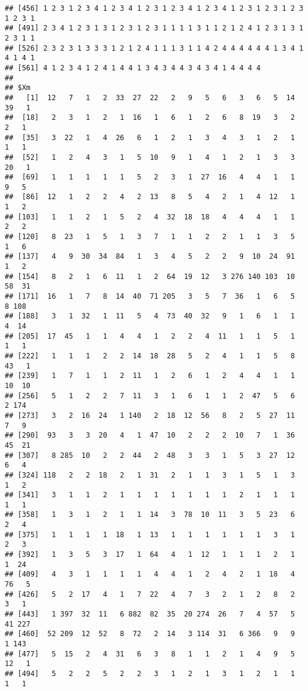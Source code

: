 \documentclass[]{article}
\begin{document}
\begin{verbatim}
## [456] 1 2 3 1 2 3 4 1 2 3 4 1 2 3 1 2 3 4 1 2 3 4 1 2 3 1 2 3 1 2 3 1 2 3 1
## [491] 2 3 4 1 2 3 1 3 1 2 3 1 2 3 1 1 1 1 3 1 1 2 1 2 4 1 2 3 1 3 1 2 3 1 1
## [526] 2 3 2 3 1 3 3 3 1 2 1 2 4 1 1 1 3 1 1 4 2 4 4 4 4 4 4 1 3 4 1 4 1 4 1
## [561] 4 1 2 3 4 1 2 4 1 4 4 1 3 4 3 4 4 3 4 3 4 1 4 4 4 4
## 
## $Xm
##   [1]  12   7   1   2  33  27  22   2   9   5   6   3   6   5  14  39   1
##  [18]   2   3   1   2   1  16   1   6   1   2   6   8  19   3   2   2   1
##  [35]   3  22   1   4  26   6   1   2   1   3   4   3   1   2   1   1   1
##  [52]   1   2   4   3   1   5  10   9   1   4   1   2   1   3   3  20   1
##  [69]   1   1   1   1   1   5   2   3   1  27  16   4   4   1   1   9   5
##  [86]  12   1   2   2   4   2  13   8   5   4   2   1   4  12   1   1   2
## [103]   1   1   2   1   5   2   4  32  18  18   4   4   4   1   1   2   2
## [120]   8  23   1   5   1   3   7   1   1   2   2   1   1   3   5   1   6
## [137]   4   9  30  34  84   1   3   4   5   2   2   9  10  24  91   1   2
## [154]   8   2   1   6  11   1   2  64  19  12   3 276 140 103  10  58  31
## [171]  16   1   7   8  14  40  71 205   3   5   7  36   1   6   5   8 108
## [188]   3   1  32   1  11   5   4  73  40  32   9   1   6   1   1   4  14
## [205]  17  45   1   1   4   4   1   2   2   4  11   1   1   5   1   1   1
## [222]   1   1   1   2   2  14  18  28   5   2   4   1   1   5   8  43   1
## [239]   1   7   1   1   2  11   1   2   6   1   2   4   4   1   1  10  10
## [256]   5   1   2   2   7  11   3   1   6   1   1   2  47   5   6   2 174
## [273]   3   2  16  24   1 140   2  18  12  56   8   2   5  27  11   7   9
## [290]  93   3   3  20   4   1  47  10   2   2   2  10   7   1  36  45  21
## [307]   8 285  10   2   2  44   2  48   3   3   1   5   3  27  12   6   4
## [324] 118   2   2  18   2   1  31   2   1   1   3   1   5   1   3   1   2
## [341]   3   1   1   2   1   1   1   1   1   1   1   2   1   1   1   1   1
## [358]   1   3   1   2   1   1  14   3  78  10  11   3   5  23   6   2   4
## [375]   1   1   1   1  18   1  13   1   1   1   1   1   1   3   1   2   3
## [392]   1   3   5   3  17   1  64   4   1  12   1   1   1   2   1   1  24
## [409]   4   3   1   1   1   1   4   4   1   2   4   2   1  18   4  76   5
## [426]   5   2  17   4   1   7  22   4   7   3   2   1   2   8   2   3   1
## [443]   1 397  32  11   6 882  82  35  20 274  26   7   4  57   5  41 227
## [460]  52 209  12  52   8  72   2  14   3 114  31   6 366   9   9   1 143
## [477]   5  15   2   4  31   6   3   8   1   1   2   1   4   9   5  12   1
## [494]   5   2   2   5   2   2   3   1   2   1   3   1   2   1   1   1   1

\end{verbatim}
\end{document}
